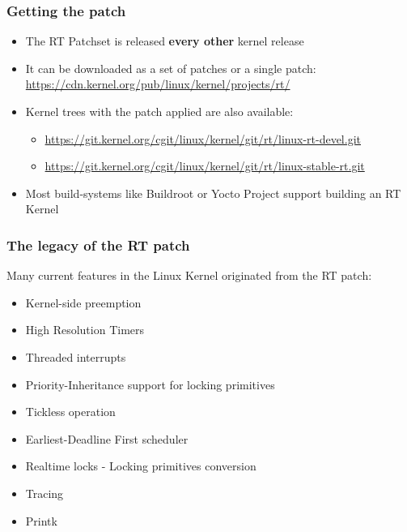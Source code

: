 \begin{frame}
  \frametitle{Getting the patch}
	\begin{itemize}
		\item The RT Patchset is released \textbf{every other} kernel release
		\item It can be downloaded as a set of patches or a single patch: \\
			\url{https://cdn.kernel.org/pub/linux/kernel/projects/rt/}
		\item Kernel trees with the patch applied are also available:
			\begin{itemize}
				\item \url{https://git.kernel.org/cgit/linux/kernel/git/rt/linux-rt-devel.git}
				\item \url{https://git.kernel.org/cgit/linux/kernel/git/rt/linux-stable-rt.git}
			\end{itemize}
		\item Most build-systems like Buildroot or Yocto Project support building an RT Kernel
	\end{itemize}
\end{frame}

\begin{frame}
  \frametitle{The legacy of the RT patch}
  Many current features in the Linux Kernel originated from the RT patch:
	\begin{itemize}
		\item Kernel-side preemption
		\item High Resolution Timers
		\item Threaded interrupts
		\item Priority-Inheritance support for locking primitives
		\item Tickless operation
		\item Earliest-Deadline First scheduler
		\item Realtime locks - Locking primitives conversion
		\item Tracing
		\item Printk
	\end{itemize}
\end{frame}

